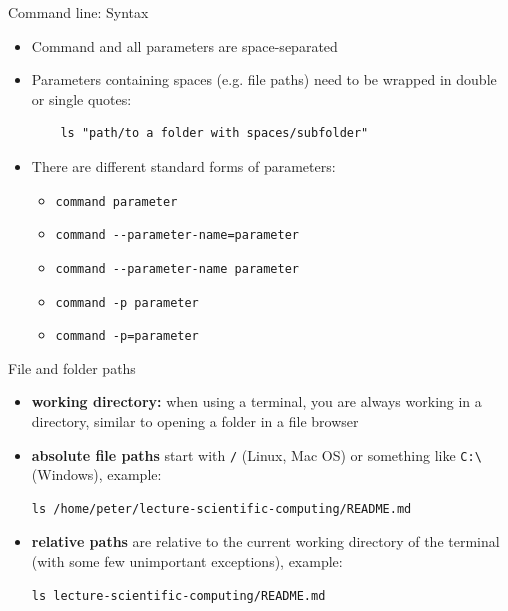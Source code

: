 \begin{frame}[fragile]{Command line: Syntax}

    \begin{itemize}
        \item Command and all parameters are space-separated
        \item Parameters containing spaces (e.g. file paths) need to be wrapped in double or single
            quotes:
            \begin{verbatim}
    ls "path/to a folder with spaces/subfolder"\end{verbatim}
        \item There are different standard forms of parameters:
        \begin{itemize}
            \item \verb|command parameter|
            \item \verb|command --parameter-name=parameter|
            \item \verb|command --parameter-name parameter|
            \item \verb|command -p parameter|
            \item \verb|command -p=parameter|
        \end{itemize}
    \end{itemize}


\end{frame}


\begin{frame}[fragile]{File and folder paths}
    \begin{itemize}
        \item {\bf working directory:} when using a terminal, you are always working in a
            directory, similar to opening a folder in a file browser
        \item {\bf absolute file paths} start with \verb|/| (Linux, Mac OS) or something like \verb|C:\|
            (Windows), example:
            {\small
            \begin{verbatim}ls /home/peter/lecture-scientific-computing/README.md \end{verbatim}}
        \item {\bf relative paths} are relative to the current working directory of the terminal (with some few unimportant exceptions), example:
            {\small
            \begin{verbatim}ls lecture-scientific-computing/README.md\end{verbatim}}
    \end{itemize}

\end{frame}

